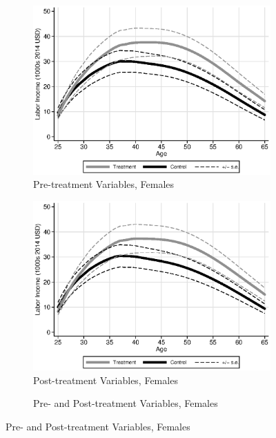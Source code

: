 \begin{figure}
\centering
\caption{Predicted Labor Income Profiles, Varying the Matching Variables}\label{fig:matchsensitivity}
\begin{subfigure}[h]{0.3\textwidth}
		\centering
		\caption{Pre-treatment Variables, Females} 
		\includegraphics[width=\textwidth]{output/labor_25-65_pset1_mset1_female.eps}
\end{subfigure}%
\begin{subfigure}[h]{0.3\textwidth}
	\centering
	\caption{Post-treatment Variables, Females} 
		\includegraphics[width=\textwidth]{output/labor_25-65_pset1_mset2_female.eps}
\end{subfigure}%
\begin{subfigure}[h]{0.3\textwidth}
	\centering
	\caption{Pre- and Post-treatment Variables, Females} 

\end{subfigure}
\end{figure}
